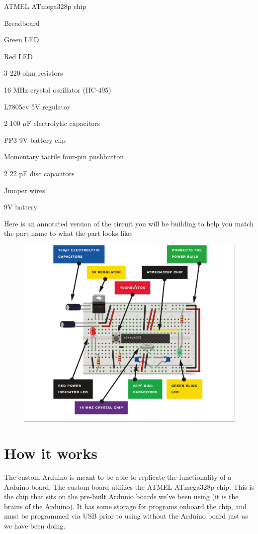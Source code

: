 \documentclass[11pt]{article}
\begin{document}
\begin{itemize}
  \begin{minipage}{0.4\linewidth}
         \item ATMEL ATmega328p chip
	 \item Breadboard
	 \item Green LED
	 \item Red LED
	 \item 3 220-ohm resistors
	 \item 16 MHz crystal oscillator (HC-495)
	 \item L7805cv 5V regulator
\end{minipage}
\begin{minipage}{0.4\linewidth}
  	 \item 2 100 $\mu$F electrolytic capacitors
	 \item PP3 9V battery clip
	 \item Momentary tactile four-pin pushbutton
	 \item 2 22 pF disc capacitors
	 \item Jumper wires
	 \item 9V battery
\end{minipage}
\end{itemize}

Here is an annotated version of the circuit you will be building to help you match
the part name to what the part looks like:

  \begin{figure}[htb]
    \centering
    \includegraphics[width=.7\linewidth]{figures/schematic-annotated.png}
    \caption{\label{fig:schematic-annotated}}
  \end{figure}


\section{How it works}
\label{sec-2}
The custom Arduino is meant to be able to replicate the functionality of a Arduino
board. The custom board utilizes the ATMEL ATmega328p chip. This is the chip that
sits on the pre-built Ardunio boards we've been using (it is the brains of the
Arduino). It has some storage for programs onboard the chip, and must be programmed
via USB prior to using without the Arduino board just as we have been doing.
\end{document}

